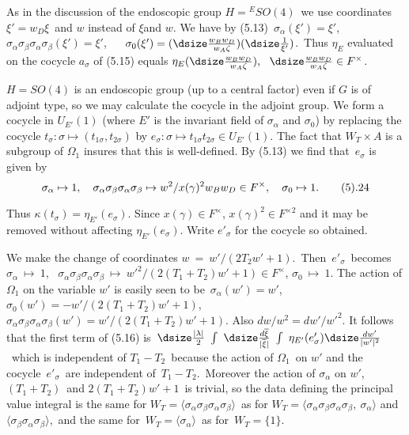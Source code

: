   As in the discussion of the endoscopic group  $H = {}^{E}SO(4)$\ we
use coordinates\ $\xi' = w_D\xi$\ and  $w$  instead of $\xi$and  $w$.  We 
have by (5.13)\ $\sigma_\alpha(\xi') = \xi'$, 
$\sigma_\alpha\sigma_\beta\sigma_\alpha\sigma_\beta(\xi') = \xi'$, ~~
$\sigma_0(\xi') = ({\dsize\frac{w_Bw_D}{w_A\zeta}})({\dsize\frac{1}{\xi'}})$.\ Thus  $\eta_E$
evaluated on the cocycle  $a_\sigma$  of (5.15) equals
$\eta_E({\dsize\frac{w_Bw_D}{w_A\zeta}}),~~ {\dsize\frac{w_Bw_D}{w_A\zeta}} \in F^\times$.

\medpagebreak

$H = SO(4)$  is an endoscopic group (up to a central factor) even if  $G$  is of adjoint type, so we may
calculate the    cocycle in the adjoint group.  We form a cocycle in  $U_{E'}(1)$
(where  $E'$  is the invariant field of  $\sigma_\alpha$  and  $\sigma_0$)  by
replacing the cocycle  $t_\sigma:  \sigma \mapsto (t_{1\sigma},t_{2\sigma})$ by
$e_\sigma:  \sigma\mapsto t_{1\sigma}t_{2\sigma}\in U_{E'} (1)$.  The fact that
$W_T\times A$  is a subgroup of  $\Omega_1$  insures that this is well-defined.
By (5.13) we find that\ $e_\sigma$  is given by
$$
\sigma_\alpha \mapsto 1,\quad  \sigma_\alpha\sigma_\beta\sigma_\alpha\sigma_\beta 
\mapsto w^2/x(\gamma)^2w_Bw_D \in F^\times,\quad \sigma_0 \mapsto 1.\tag 5.24
$$

\noindent Thus  $\kappa(t_\sigma) = \eta_{E'}(e_\sigma)$.  Since  $x(\gamma)\in F^\times$,
$x(\gamma)^2\in F^{\times 2}$  and it may be removed without affecting
$\eta_{E'}(e_\sigma)$.  Write  $e'_\sigma$  for the cocycle so obtained.

We make the change of coordinates  $w\ =\ w'/(2T_2w'+1)$.\  Then\ $e'_\sigma$\
becomes\ $\sigma_\alpha~\mapsto~ 1$,\ \linebreak 
$\sigma_\alpha\sigma_\beta\sigma_\alpha\sigma_\beta\
\mapsto~w'^2/(2(T_1+T_2)w'+1)\in F^\times$, $\sigma_0~\mapsto~1$.  The action of
$\Omega_1$  on the variable $w'$  is easily seen to be\ 
$\sigma_\alpha(w') = w'$, $\sigma_0(w') = -w'/(2(T_1+T_2)w'+1)$,
$\sigma_\alpha\sigma_\beta\sigma_\alpha\sigma_\beta(w') = w'/(2(T_1+T_2)w'+1).$
Also  $dw/w^2 = dw'/w'^2$.  It follows that the first term of (5.16)
is\  ${\dsize\frac{|\lambda|}{2}}~\int~{\dsize\frac{d\overline{\xi}}{|\overline{\xi}|}}~\int~
\eta_{E'}(e'_\sigma) {\dsize\frac{dw'}{|w'|^2}}$\  which is independent of  $T_1-T_2$\
because the action of  $\Omega_1$\ on  $w'$  and the cocycle\ $e'_\sigma$\  are
independent of\ $T_1-T_2.$\ Moreover the action of  $\sigma_\alpha$  on
$w'$, $(T_1+T_2)$\   and  $2(T_1+T_2)w'+1$\ is trivial, so the data defining the principal value
integral is the same for $W_T = \langle \sigma_\alpha\sigma_\beta\sigma_\alpha\sigma_\beta\rangle$\
as for  $W_T = \langle \sigma_\alpha\sigma_\beta\sigma_\alpha\sigma_\beta,~\sigma_\alpha\rangle$
and  $\langle \sigma_\beta\sigma_\alpha\sigma_\beta \rangle$,\ and the same
for\ $W_T = \langle \sigma_\alpha \rangle$\  as for\ $W_T = \{ 1\}$.

